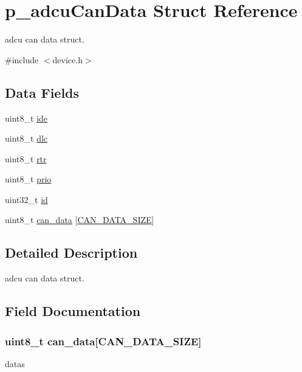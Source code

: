 \hypertarget{structp__adcuCanData}{}\section{p\+\_\+adcu\+Can\+Data Struct Reference}
\label{structp__adcuCanData}


adcu can data struct.  




{\ttfamily \#include $<$device.\+h$>$}

\subsection*{Data Fields}
\begin{DoxyCompactItemize}
\item 
uint8\+\_\+t \hyperlink{structp__adcuCanData_aa9dce2f3e5db51ea2a5d0ea09bab7e66}{ide}
\item 
uint8\+\_\+t \hyperlink{structp__adcuCanData_a19defed5d87587252d55e15cf3d5432d}{dlc}
\item 
uint8\+\_\+t \hyperlink{structp__adcuCanData_a7be9c2d0472674ddfd4e8c1ce2e460c4}{rtr}
\item 
uint8\+\_\+t \hyperlink{structp__adcuCanData_acc0b27a6740f03639727be452f1e6b83}{prio}
\item 
uint32\+\_\+t \hyperlink{structp__adcuCanData_abaabdc509cdaba7df9f56c6c76f3ae19}{id}
\item 
uint8\+\_\+t \hyperlink{structp__adcuCanData_a704eab46dad820c0565d3f81d2340f66}{can\+\_\+data} \mbox{[}\hyperlink{device_8h_acf897332482a87a49a6f253f42b3456d}{C\+A\+N\+\_\+\+D\+A\+T\+A\+\_\+\+S\+I\+ZE}\mbox{]}
\end{DoxyCompactItemize}


\subsection{Detailed Description}
adcu can data struct. 

\subsection{Field Documentation}
\subsubsection[{\texorpdfstring{can\+\_\+data}{can_data}}]{\setlength{\rightskip}{0pt plus 5cm}uint8\+\_\+t can\+\_\+data\mbox{[}{\bf C\+A\+N\+\_\+\+D\+A\+T\+A\+\_\+\+S\+I\+ZE}\mbox{]}}\hypertarget{structp__adcuCanData_a704eab46dad820c0565d3f81d2340f66}{}\label{structp__adcuCanData_a704eab46dad820c0565d3f81d2340f66}
datas 
